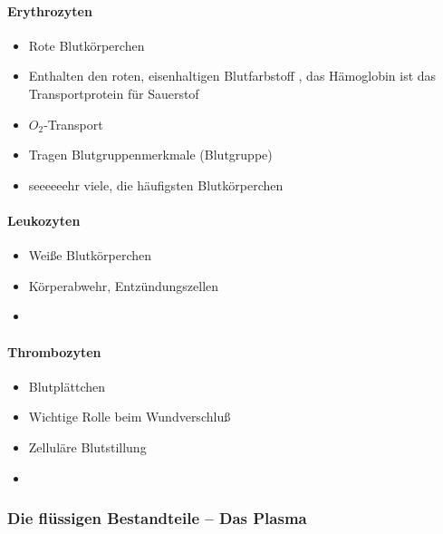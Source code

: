 \paragraph{Erythrozyten}

\begin{itemize}
    \item Rote Blutkörperchen
    \item Enthalten den roten, eisenhaltigen Blutfarbstoff
    , das Hämoglobin ist
    das Transportprotein für Sauerstof
    \item $O_2$-Transport
    \item Tragen Blutgruppenmerkmale (Blutgruppe)
    \item seeeeeehr viele, die häufigsten Blutkörperchen
\end{itemize}

\paragraph{Leukozyten}

\begin{itemize}
    \item Weiße Blutkörperchen
    \item Körperabwehr, Entzündungszellen
    \item
\end{itemize}

\paragraph{Thrombozyten}

\begin{itemize}
    \item {}Blutplättchen
    \item Wichtige Rolle beim Wundverschluß
    \item Zelluläre Blutstillung
    \item
\end{itemize}

\subsubsection{Die flüssigen Bestandteile --
Das Plasma}

